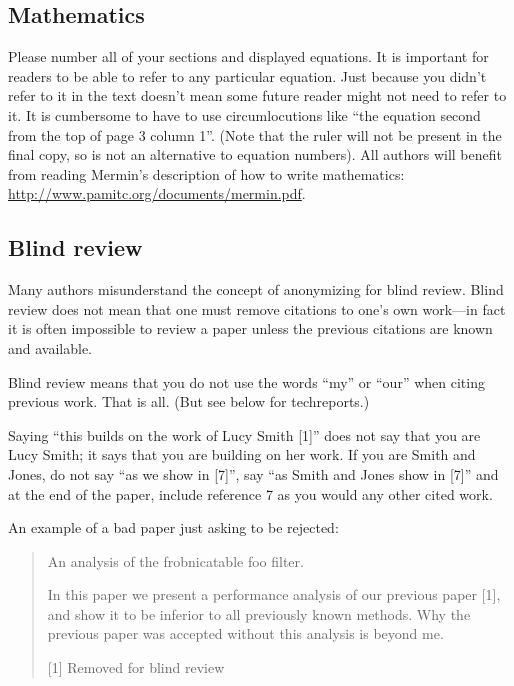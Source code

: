 \documentclass[10pt,twocolumn,letterpaper]{article}
\begin{document}
\subsection{Mathematics}

Please number all of your sections and displayed equations.  It is
important for readers to be able to refer to any particular equation.  Just
because you didn't refer to it in the text doesn't mean some future reader
might not need to refer to it.  It is cumbersome to have to use
circumlocutions like ``the equation second from the top of page 3 column
1''.  (Note that the ruler will not be present in the final copy, so is not
an alternative to equation numbers).  All authors will benefit from reading
Mermin's description of how to write mathematics:
\url{http://www.pamitc.org/documents/mermin.pdf}.


\subsection{Blind review}

Many authors misunderstand the concept of anonymizing for blind
review.  Blind review does not mean that one must remove
citations to one's own work---in fact it is often impossible to
review a paper unless the previous citations are known and
available.

Blind review means that you do not use the words ``my'' or ``our''
when citing previous work.  That is all.  (But see below for
techreports.)

Saying ``this builds on the work of Lucy Smith [1]'' does not say
that you are Lucy Smith; it says that you are building on her
work.  If you are Smith and Jones, do not say ``as we show in
[7]'', say ``as Smith and Jones show in [7]'' and at the end of the
paper, include reference 7 as you would any other cited work.

An example of a bad paper just asking to be rejected:
\begin{quote}
\begin{center}
    An analysis of the frobnicatable foo filter.
\end{center}

   In this paper we present a performance analysis of our
   previous paper [1], and show it to be inferior to all
   previously known methods.  Why the previous paper was
   accepted without this analysis is beyond me.

   [1] Removed for blind review
\end{quote}
\end{document}
